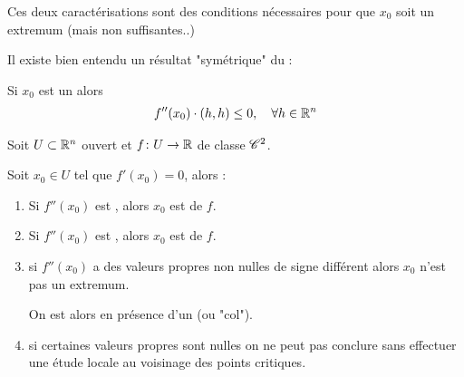 \documentclass[french,a4paper,10pt]{article}
\begin{document}
	\begin{oc-remark}
		Ces deux caractérisations sont des conditions nécessaires pour que $x_0$ soit un extremum (mais non suffisantes..)
		
	\end{oc-remark}
	
	\begin{oc-remark}
		Il existe bien entendu un résultat "symétrique" du :
		\begin{no-num-theorem}
			Si $x_0$ est un  alors 
				\[\begin{aligned}
					f''(x_0)\cdot (h,h)\le 0,\quad\forall h\in\mathbb{R}^n
				\end{aligned}\]
			
		\end{no-num-theorem}
		
	\end{oc-remark}
	
	\begin{oc-theorem}
		Soit $U\subset \mathbb{R}^n$ ouvert et $f\colon U\to\mathbb{R}$ de classe $\mathscr{C}^2$.
		
		Soit $x_0\in U$ tel que $f'(x_0)=0$, alors :
		\begin{enumerate}[label=$(\roman*)$]
			\item Si $f''(x_0)$ est , alors $x_0$ est  de $f$.
			\item Si $f''(x_0)$ est , alors $x_0$ est  de $f$.
			\item si $f''(x_0)$ a des valeurs propres non nulles de signe différent alors $x_0$ n'est pas un extremum.
			
			On est alors en présence d'un  (ou "col").
			
			\item si certaines valeurs propres sont nulles on ne peut pas conclure sans effectuer une étude locale au voisinage des points critiques.
		\end{enumerate}
		
	\end{oc-theorem}
	
\end{document}
